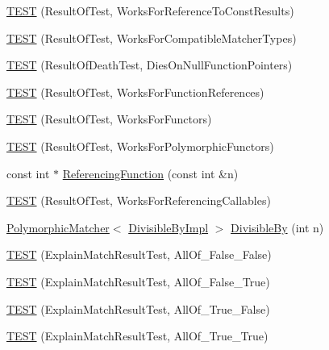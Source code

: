 \begin{DoxyCompactItemize}
\item 
\hyperlink{namespacetesting_1_1gmock__matchers__test_a17b952cce22be6338fb1369f886d61c4}{T\+E\+ST} (Result\+Of\+Test, Works\+For\+Reference\+To\+Const\+Results)
\item 
\hyperlink{namespacetesting_1_1gmock__matchers__test_a1aceb307c843f0f5532053e390a7c654}{T\+E\+ST} (Result\+Of\+Test, Works\+For\+Compatible\+Matcher\+Types)
\item 
\hyperlink{namespacetesting_1_1gmock__matchers__test_a4c929e5b46a503a9bb48c8b88dcbbf2a}{T\+E\+ST} (Result\+Of\+Death\+Test, Dies\+On\+Null\+Function\+Pointers)
\item 
\hyperlink{namespacetesting_1_1gmock__matchers__test_a1638ee6460100cbe21c65b6cdc06579a}{T\+E\+ST} (Result\+Of\+Test, Works\+For\+Function\+References)
\item 
\hyperlink{namespacetesting_1_1gmock__matchers__test_a19b7a39915f7ad5a0b741caf7ae4e619}{T\+E\+ST} (Result\+Of\+Test, Works\+For\+Functors)
\item 
\hyperlink{namespacetesting_1_1gmock__matchers__test_a976290e53e319b06c51a94f7e450d765}{T\+E\+ST} (Result\+Of\+Test, Works\+For\+Polymorphic\+Functors)
\item 
const int $\ast$ \hyperlink{namespacetesting_1_1gmock__matchers__test_af3164fc302e0b727c1eb745bdeb959f6}{Referencing\+Function} (const int \&n)
\item 
\hyperlink{namespacetesting_1_1gmock__matchers__test_a00ee08657c9e9e0c306be7b84cd2848c}{T\+E\+ST} (Result\+Of\+Test, Works\+For\+Referencing\+Callables)
\item 
\hyperlink{classtesting_1_1_polymorphic_matcher}{Polymorphic\+Matcher}$<$ \hyperlink{classtesting_1_1gmock__matchers__test_1_1_divisible_by_impl}{Divisible\+By\+Impl} $>$ \hyperlink{namespacetesting_1_1gmock__matchers__test_ac5b1fd3b6a8141c7e83ef6040ed4630f}{Divisible\+By} (int n)
\item 
\hyperlink{namespacetesting_1_1gmock__matchers__test_aa9a60a406d9f495de8c8552abf577dd1}{T\+E\+ST} (Explain\+Match\+Result\+Test, All\+Of\+\_\+\+False\+\_\+\+False)
\item 
\hyperlink{namespacetesting_1_1gmock__matchers__test_a099aebb5417d5bd85e11aefe935ec345}{T\+E\+ST} (Explain\+Match\+Result\+Test, All\+Of\+\_\+\+False\+\_\+\+True)
\item 
\hyperlink{namespacetesting_1_1gmock__matchers__test_a5d386691eaed59994a1d2b65f94b23a9}{T\+E\+ST} (Explain\+Match\+Result\+Test, All\+Of\+\_\+\+True\+\_\+\+False)
\item 
\hyperlink{namespacetesting_1_1gmock__matchers__test_a16545b298640b253502d604f52ea95e2}{T\+E\+ST} (Explain\+Match\+Result\+Test, All\+Of\+\_\+\+True\+\_\+\+True)

\end{DoxyCompactItemize}
